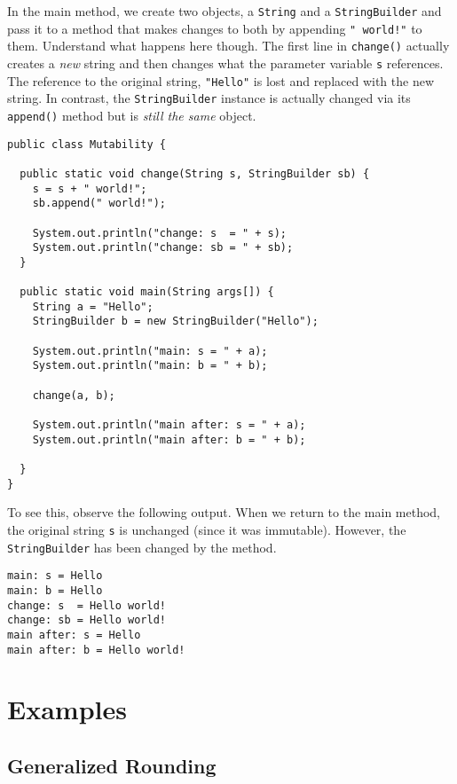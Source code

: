 In the main method, we create two objects, a 
\texttt{String} and a \texttt{StringBuilder}
and pass it to a method that makes changes to both by
appending \texttt{" world!"} to them.  Understand
what happens here though.  The first line in \texttt{change()}
actually creates a \emph{new} string and then changes
what the parameter variable \texttt{s} references.
The reference to the original string, \texttt{"Hello"} is lost and
replaced with the new string.  In contrast, the \texttt{StringBuilder}
instance is actually changed via its \texttt{append()}
method but is \emph{still the same} object.

\begin{verbatim}
public class Mutability {
  
  public static void change(String s, StringBuilder sb) {    
    s = s + " world!";
    sb.append(" world!");
    
    System.out.println("change: s  = " + s);
    System.out.println("change: sb = " + sb);
  }

  public static void main(String args[]) {
    String a = "Hello";
    StringBuilder b = new StringBuilder("Hello");

    System.out.println("main: s = " + a);
    System.out.println("main: b = " + b);
    
    change(a, b);

    System.out.println("main after: s = " + a);
    System.out.println("main after: b = " + b);

  }
}
\end{verbatim}

To see this, observe the following output.  When we
return to the main method, the original string \texttt{s}
is unchanged (since it was immutable).  However, the
\texttt{StringBuilder} has been changed by
the method.


\begin{verbatim}
main: s = Hello
main: b = Hello
change: s  = Hello world!
change: sb = Hello world!
main after: s = Hello
main after: b = Hello world!
\end{verbatim}

\section{Examples}

\subsection{Generalized Rounding}

